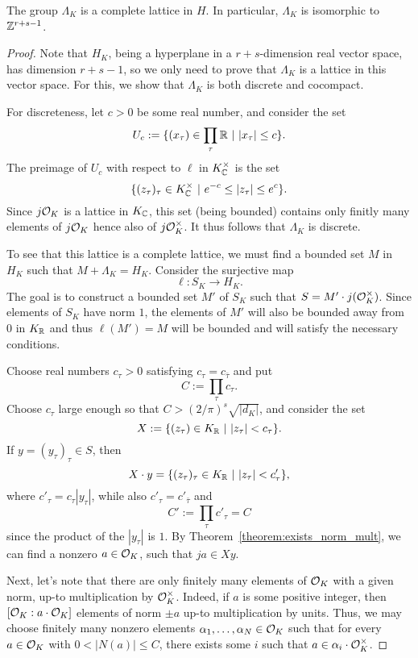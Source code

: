 \begin{theorem}
  The group $\Lambda_{K}$ is a complete lattice in $H$.
  In particular, $\Lambda_{K}$ is isomorphic to $\mathbb{Z}^{r + s - 1}$.
\end{theorem}
\begin{proof}
  Note that $H_{K}$, being a hyperplane in a $r+s$-dimension real vector space, has dimension $r + s - 1$, so we only need to prove that $\Lambda_{K}$ is a lattice in this vector space.
  For this, we show that $\Lambda_{K}$ is both discrete and cocompact.

  For discreteness, let $c > 0$ be some real number, and consider the set
  \[ U_{c} := \{(x_{\tau}) \in \prod_{\tau} \Rbb \ | \ |x_{\tau}| \le c\}. \]
  The preimage of $U_{c}$ with respect to $\ell$ in $K_{\mathbb{C}}^{\times}$ is the set
  \[ \{(z_{\tau})_{\tau} \in K_{\Cbb}^{\times} \ | \ e^{-c} \le |z_{\tau}| \le e^{c} \}. \]
  Since $j \mathcal{O}_{K}$ is a lattice in $K_{\mathbb{C}}$, this set (being bounded) contains only finitly many elements of $j \mathcal{O}_{K}$ hence also of $j \mathcal{O}_{K}^{\times}$.
  It thus follows that $\Lambda_{K}$ is discrete.

  To see that this lattice is a complete lattice, we must find a bounded set $M$ in $H_{K}$ such that $M + \Lambda_{K} = H_{K}$.
  Consider the surjective map
  \[ \ell : S_{K} \to H_{K}. \]
  The goal is to construct a bounded set $M'$ of $S_{K}$ such that $S = M' \cdot j(\mathcal{O}_{K}^{\times})$.
  Since elements of $S_{K}$ have norm $1$, the elements of $M'$ will also be bounded away from $0$ in $K_{\mathbb{R}}$ and thus $\ell(M') = M$ will be bounded and will satisfy the necessary conditions.

  Choose real numbers $c_{\tau} > 0$ satisfying $c_{\tau} = c_{\bar \tau}$ and put
  \[ C := \prod_{\tau} c_{\tau}. \]
  Choose $c_{\tau}$ large enough so that $C > (2/\pi)^{s} \sqrt{|d_{K}|}$, and consider the set
  \[ X := \{ (z_{\tau}) \in K_{\mathbb{R}} \ | \ |z_{\tau}| < c_{\tau} \}. \]
  If $y = (y_{\tau})_{\tau} \in S$, then
  \[ X \cdot y = \{ (z_{\tau})_{\tau} \in K_{\mathbb{R}} \ | \ |z_{\tau}| < c'_{\tau}\}, \]
  where $c'_{\tau} = c_{\tau}|y_{\tau}|$, while also $c'_{\tau} = c'_{\bar\tau}$ and
  \[ C' := \prod_{\tau} c'_{\tau} = C \]
  since the product of the $|y_{\tau}|$ is $1$.
  By Theorem~\ref{theorem:exists_norm_mult}, we can find a nonzero $a \in \mathcal{O}_{K}$, such that $ja \in Xy$.

  Next, let's note that there are only finitely many elements of $\mathcal{O}_{K}$ with a given norm, up-to multiplication by $\mathcal{O}_{K}^{\times}$.
  Indeed, if $a$ is some positive integer, then  $[\mathcal{O}_{K} : a \cdot \mathcal{O}_{K}]$ elements of norm $\pm a$ up-to multiplication by units.
  Thus, we may choose finitely many nonzero elements $\alpha_{1},\ldots,\alpha_{N} \in \mathcal{O}_{K}$ such that for every $a \in \mathcal{O}_{K}$ with $0 < |N(a)| \le C$, there exists some $i$ such that $a \in \alpha_{i} \cdot \mathcal{O}_{K}^{\times}$.


\end{proof}
